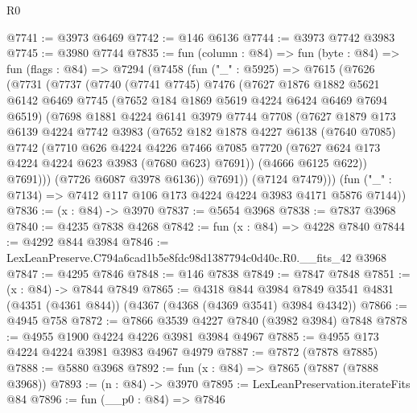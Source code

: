 \begin{lexlean}{R0}
\begin{coremodule}
@7741 := @3973 @6469
@7742 := @146 @6136
@7744 := @3973 @7742 @3983
@7745 := @3980 @7744
@7835 := fun (column : @84) =>
  fun (byte : @84) =>
  fun (flags : @84) =>
  @7294
    (@7458
      (fun ("_" : @5925) =>
      @7615
        (@7626
          (@7731
            (@7737
              (@7740
                (@7741 @7745)
                @7476
                (@7627
                  @1876
                  @1882
                  @5621
                  @6142
                  @6469
                  @7745
                  (@7652 @184 @1869 @5619 @4224 @6424 @6469 @7694 @6519)
                  (@7698
                    @1881
                    @4224
                    @6141
                    @3979
                    @7744
                    @7708
                    (@7627
                      @1879
                      @173
                      @6139
                      @4224
                      @7742
                      @3983
                      (@7652
                        @182
                        @1878
                        @4227
                        @6138
                        (@7640 @7085)
                        @7742
                        (@7710
                          @626
                          @4224
                          @4226
                          @7466
                          @7085
                          @7720
                          (@7627 @624 @173 @4224 @4224 @623 @3983 (@7680 @623) @7691))
                        (@4666 @6125 @622))
                      @7691)))
                (@7726 @6087 @3978 @6136))
              @7691))
          (@7124 @7479)))
      (fun ("_" : @7134) => @7412 @117 @106 @173 @4224 @4224 @3983 @4171 @5876 @7144))
@7836 := (x : @84) -> @3970
@7837 := @5654 @3968
@7838 := @7837 @3968
@7840 := @4235 @7838 @4268
@7842 := fun (x : @84) => @4228 @7840
@7844 := @4292 @844 @3984
@7846 := LexLeanPreserve.C794a6cad1b5e8fdc98d1387794c0d40c.R0.__fits_42 @3968
@7847 := @4295 @7846
@7848 := @146 @7838
@7849 := @7847 @7848
@7851 := (x : @84) -> @7844 @7849
@7865 := @4318
    @844
    @3984
    @7849
    @3541
    @4831
    (@4351 (@4361 @844))
    (@4367 (@4368 (@4369 @3541) @3984 @4342))
@7866 := @4945 @758
@7872 := @7866 @3539 @4227 @7840 (@3982 @3984) @7848
@7878 := @4955 @1900 @4224 @4226 @3981 @3984 @4967
@7885 := @4955 @173 @4224 @4224 @3981 @3983 @4967 @4979
@7887 := @7872 (@7878 @7885)
@7888 := @5880 @3968
@7892 := fun (x : @84) => @7865 (@7887 (@7888 @3968))
@7893 := (n : @84) -> @3970
@7895 := LexLeanPreservation.iterateFits @84
@7896 := fun (__p0 : @84) => @7846

\end{coremodule}
\end{lexlean}
